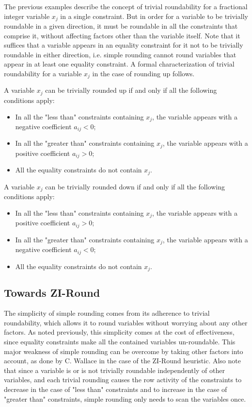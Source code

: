 \documentclass[a4paper,12pt,twoside]{scrbook}
\begin{document}
The previous examples describe the concept of trivial roundability for a fractional integer variable $x_j$ in a single constraint. But in order for a variable to be trivially roundable in a given direction, it must be roundable in all the constraints that comprise it, without affecting factors other than the variable itself. 
Note that it suffices that a variable appears in an equality constraint for it not to be trivially roundable in either direction, i.e. simple rounding cannot round variables that appear in at least one equality constraint.
A formal characterization of trivial roundability for a variable $x_j$ in the case of rounding up follows. \par 
A variable $x_j$ can be trivially rounded up if and only if all the following conditions apply:
\begin{itemize}
	\item In all the "less than" constraints containing $x_j$, the variable appears with a negative coefficient $a_{ij} < 0$;
	\item In all the "greater than" constraints containing $x_j$, the variable appears with a positive coefficient $a_{ij} > 0$;
	\item All the equality constraints do not contain $x_j$.
\end{itemize} \par 
A variable $x_j$ can be trivially rounded down if and only if all the following conditions apply:
\begin{itemize}
	\item In all the "less than" constraints containing $x_j$, the variable appears with a positive coefficient $a_{ij} > 0$;
	\item In all the "greater than" constraints containing $x_j$, the variable appears with a negative coefficient $a_{ij} < 0$;
	\item All the equality constraints do not contain $x_j$.
\end{itemize}
\par

\subsection{Towards ZI-Round}
The simplicity of simple rounding comes from its adherence to trivial roundability, which allows it to round variables without worrying about any other factors. As noted previously, this simplicity comes at the cost of effectiveness, since equality constraints make all the contained variables un-roundable. This major weakness of simple rounding can be overcome by taking other factors into account, as done by C. Wallace \cite{wallace2010} in the case of the ZI-Round heuristic. Also note that since a variable is or is not trivially roundable independently of other variables, and each trivial rounding causes the row activity of the constraints to decrease in the case of "less than" constraints and to increase in the case of "greater than" constraints, simple rounding only needs to scan the variables once.
\end{document}
